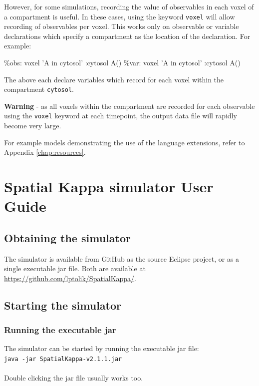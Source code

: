 \documentclass[english]{report}
\def\tbf#1{\textbf{#1}}
\begin{document}
However, for some simulations, recording the value of observables in each voxel of a compartment is useful. In these cases, using the keyword \verb|voxel| will allow recording of observables per voxel. This works only on observable or variable declarations which specify a compartment as the location of the declaration. For example:

\begin{kappasource}
\%obs: voxel 'A in cytosol' :cytosol A()
\%var: voxel 'A in cytosol' :cytosol A()
\end{kappasource}

The above each declare variables which record for each voxel within the compartment \verb|cytosol|.

\tbf{Warning} - as all voxels within the compartment are recorded for each observable using the \verb|voxel| keyword at each timepoint, the output data file will rapidly become very large.

\bigskip For example models demonstrating the use of the language extensions, refer to Appendix \ref{chap:resources}.

%
%

\chapter{Spatial Kappa simulator User Guide}

\section{Obtaining the simulator}

The simulator is available from GitHub as the source Eclipse project, or as a single executable jar file. Both are available at \url{https://github.com/lptolik/SpatialKappa/}. 

\section{Starting the simulator}

\subsection{Running the executable jar}

The simulator can be started by running the executable jar file:\\
\verb|java -jar SpatialKappa-v2.1.1.jar|\\\\
Double clicking the jar file usually works too.
\end{document}
